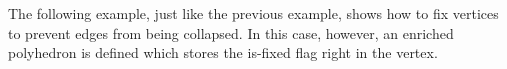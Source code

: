The following example, just like the previous example, shows how to fix vertices to prevent edges from being collapsed. In this case, however, an enriched polyhedron is defined which stores the is-fixed flag right in the vertex.




